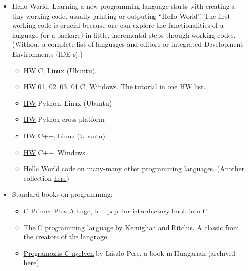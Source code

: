 \documentclass{article}
\begin{document}
\begin{itemize}
    \item Hello World. Learning a new programming language starts with creating a tiny working code, usually printing or outputing ``Hello World''.  The first working code is crucial because one can explore the functionalities of a language (or a package) in little, incremental steps through working codes. (Without a complete list of languages and editors or Integrated Development Environments (IDE-s).)
    \begin{itemize}
        \item \href{https://www.youtube.com/watch?v=87u667BoHkg}{HW} C, Linux (Ubuntu).
        \item \href{https://www.youtube.com/watch?v=2NWeucMKrLI}{HW 01}, \href{https://www.youtube.com/watch?v=3DeLiClDd04}{02}, \href{https://www.youtube.com/watch?v=iWx3yyFMWQA}{03}, \href{https://www.youtube.com/watch?v=oSpmApiUsHw}{04} C, Windows. The tutorial in one \href{https://www.youtube.com/playlist?list=PL6gx4Cwl9DGAKIXv8Yr6nhGJ9Vlcjyymq}{HW list}.
        \item \href{https://www.youtube.com/watch?v=98fYq1BIOEk}{HW} Python, Linux (Ubuntu)
        \item \href{https://www.youtube.com/watch?v=KOdfpbnWLVo}{HW} Python cross platform
        \item \href{https://www.youtube.com/watch?v=yXMb7SC9gHg}{HW} C++, Linux (Ubuntu)
        \item \href{https://www.youtube.com/watch?v=VBjEoGX5rFI}{HW} C++, Windows
        \item \href{http://rosettacode.org/wiki/Hello_world/Text}{Hello World} code on many-many other programming languages. (Another collection \href{http://helloworldcollection.de/}{here})
    \end{itemize}
    
    \item Standard books on programming:
    \begin{itemize}
        \item \href{https://www.goodreads.com/book/show/120642.C_Primer_Plus}{C Primer Plus} A huge, but popular introductory book into C
        \item \href{https://www.goodreads.com/book/show/515601.The_C_Programming_Language}{The C     programming language} by Kernighan and Ritchie. A classic from the creators of the language.
        
        \item \href{https://moly.hu/konyvek/pere-laszlo-unix-gnu-linux-programozas-c-nyelven}{Programozás C nyelven} by László Pere, a book in Hungarian (archived \href{https://web.archive.org/web/20230331010856/https://people.inf.elte.hu/budraai/Prog/c%20prog.pdf}{here})
        

\end{itemize}
\end{itemize}
\end{document}
